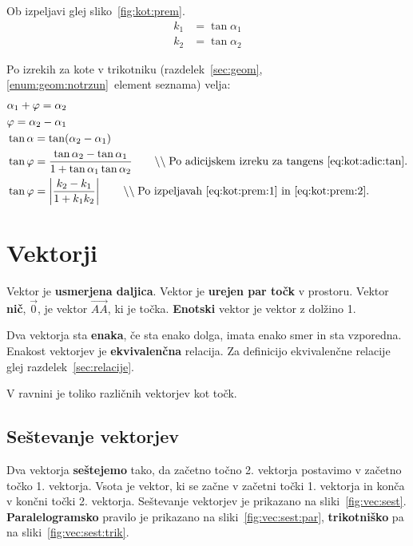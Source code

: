 \documentclass[a4paper,oneside,12pt,fleqn]{article}
\newcommand{\comment}[1]{\ensuremath{\qquad\backslash\backslash\;}\textnormal{#1}}
\def\Vec{\overrightarrow}
\numberwithin{equation}{section}
\begin{document}
Ob izpeljavi glej sliko~\ref{fig:kot:prem}.
\begin{align}
  k_1 &= \tan\alpha_1 \label{eq:kot:prem:1} \\
  k_2 &= \tan\alpha_2 \label{eq:kot:prem:2}
\end{align}

Po izrekih za kote v trikotniku (razdelek~\ref{sec:geom},
\ref{enum:geom:notrzun}~element seznama) velja:
\begin{align*}
  & \alpha_1 + \varphi = \alpha_2 \\
  & \varphi = \alpha_2 - \alpha_1 \\
  & \tan\alpha = \tan(\alpha_2 - \alpha_1) \\
  & \tan\varphi = \frac{\tan\alpha_2 - \tan\alpha_1}{1+\tan\alpha_1\tan\alpha_2} 
  \comment{Po adicijskem izreku za tangens~\eqref{eq:kot:adic:tan}.} \\
  & \tan\varphi = \left| \frac{k_2-k_1}{1+k_1k_2} \right| \comment{Po
  izpeljavah~\eqref{eq:kot:prem:1} in~\eqref{eq:kot:prem:2}.}
\end{align*}

\section{Vektorji}
\label{sec:vec}
Vektor je \textbf{usmerjena daljica}. Vektor je \textbf{urejen par točk} v prostoru.
Vektor \textbf{nič}, $\vec{0}$, je vektor $\Vec{AA}$, ki je točka. 
\textbf{Enotski} vektor je vektor z dolžino 1.

Dva vektorja sta \textbf{enaka}, če sta enako dolga, imata enako smer in sta vzporedna.
Enakost vektorjev je \textbf{ekvivalenčna} relacija. Za definicijo ekvivalenčne relacije glej
razdelek~\ref{sec:relacije}.

V ravnini je toliko različnih vektorjev kot točk.

\subsection{Seštevanje vektorjev}
\label{sec:vec:sest}
Dva vektorja \textbf{seštejemo} tako, da začetno točno 2. vektorja postavimo v začetno točko 1. vektorja. Vsota je vektor, ki
se začne v začetni točki 1. vektorja in konča v končni točki 2. vektorja. Seštevanje
vektorjev je prikazano na sliki~\ref{fig:vec:sest}.
\textbf{Paralelogramsko} pravilo je prikazano na sliki~\ref{fig:vec:sest:par},
\textbf{trikotniško} pa na
sliki~\ref{fig:vec:sest:trik}.
\end{document}
